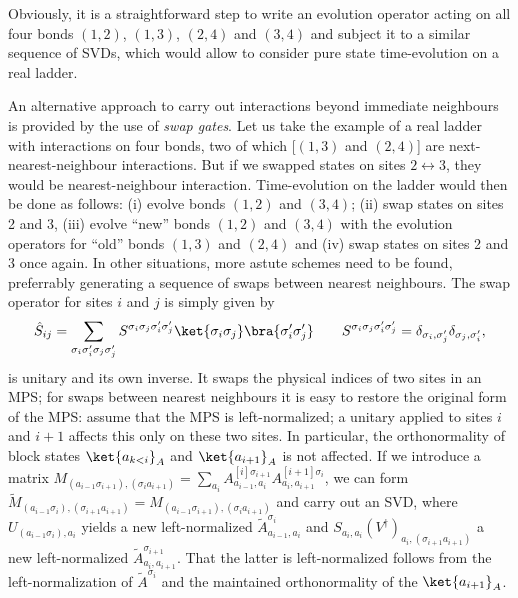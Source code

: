 Obviously, it is a straightforward step to write an evolution operator acting on all four bonds $(1,2)$, $(1,3)$, $(2,4)$ and $(3,4)$ and subject it to a similar sequence of SVDs, which would allow to consider pure state time-evolution on a real ladder. 

An alternative approach to carry out interactions beyond immediate neighbours is provided by the use of {\em swap gates}\cite{Stoudenmire10}. Let us take the example of a real ladder with interactions on four bonds, two of which [$(1,3)$ and $(2,4)$] are next-nearest-neighbour interactions. But if we swapped states on sites $2 \leftrightarrow 3$, they would be nearest-neighbour interaction. Time-evolution on the ladder would then be done as follows: (i) evolve bonds $(1,2)$ and $(3,4)$; (ii) swap states on sites 2 and 3, (iii) evolve ``new'' bonds $(1,2)$ and $(3,4)$ with the evolution operators for ``old'' bonds $(1,3)$ and $(2,4)$ and (iv) swap states on sites 2 and 3 once again. In other situations, more astute schemes need to be found, preferrably generating a sequence of swaps between nearest neighbours. The swap operator for sites $i$ and $j$ is simply given by
\begin{equation}
\hat{S}_{ij} = \sum_{\sigma_i\sigma'_i \sigma_j\sigma'_j} S^{\sigma_i\sigma_j \sigma'_i \sigma'_j} \ket{\sigma_i\sigma_j}\bra{\sigma'_i\sigma'_j} \quad\quad 
S^{\sigma_i\sigma_j \sigma'_i \sigma'_j} = \delta_{\sigma_i,\sigma'_j} \delta_{\sigma_j,\sigma'_i},
\end{equation}
is unitary and its own inverse. It swaps the physical indices of two sites in an MPS; for swaps between nearest neighbours it is easy to restore the original form of the MPS: assume that the MPS is left-normalized; a unitary applied to sites $i$ and $i+1$ affects this only on these two sites. In particular, the orthonormality of block states $\ket{a_{k<i}}_A$ and $\ket{a_{i+1}}_A$ is not affected.
If we introduce a matrix $M_{(a_{i-1}\sigma_{i+1}),(\sigma_i a_{i+1})} = \sum_{a_i} A^{[i]\sigma_{i+1}}_{a_{i-1},a_i} A^{[i+1]\sigma_i}_{a_i,a_{i+1}}$, we can form $\tilde{M}_{(a_{i-1}\sigma_i),(\sigma_{i+1}a_{i+1})}=M_{(a_{i-1}\sigma_{i+1}),(\sigma_i a_{i+1})}$ and carry out an SVD, where $U_{(a_{i-1}\sigma_i),a_i}$ yields a new left-normalized $\tilde{A}^{\sigma_i}_{a_{i-1},a_i}$ and 
$S_{a_i,a_i} (V^\dagger)_{a_i,(\sigma_{i+1}a_{i+1})}$ a new left-normalized $\tilde{A}^{\sigma_{i+1}}_{a_{i},a_{i+1}}$. That the latter is left-normalized follows from the left-normalization of $\tilde{A}^{\sigma_i}$ and the maintained orthonormality of the $\ket{a_{i+1}}_A$.


